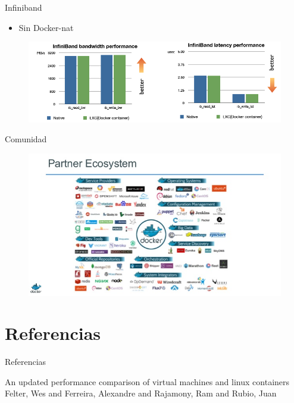 \documentclass[compress]{beamer}
\begin{document}
\begin{frame}{Infiniband}
	\begin{itemize}
		\item  Sin Docker-nat
	\end{itemize}
\begin{figure}[H]
  \centering
  \includegraphics[width=1\textwidth]{images/infiniband.png}
    \label{fig:dynamic}
\end{figure}	
\end{frame}


\begin{frame}{Comunidad}
\begin{figure}[H]
  \centering
  \includegraphics[width=1\textwidth]{images/ecosystem.jpg}
    \label{fig:dynamic}
\end{figure}		
\end{frame}
	
\section*{Referencias}
\begin{frame}{Referencias}
	\begin{thebibliography}{10}
    
	\beamertemplatebookbibitems
	An updated performance comparison of virtual machines and linux containers
	\newblock Felter, Wes and Ferreira, Alexandre and Rajamony, Ram and Rubio, Juan
  \end{thebibliography}
\end{frame}

\maketitle
\end{document}
